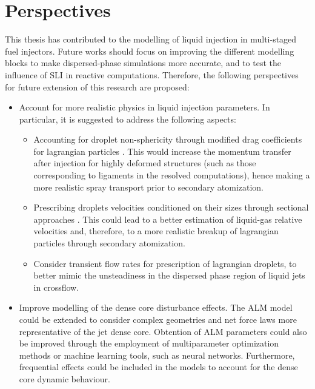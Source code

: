 \clearpage




\section*{Perspectives}

This thesis has contributed to the modelling of liquid injection in multi-staged fuel injectors. Future works should focus on improving the different modelling blocks to make dispersed-phase simulations more accurate, and to test the influence of SLI in reactive computations. Therefore, the following perspectives for future extension of this research are proposed:


\begin{itemize}

	\item Account for more realistic physics in liquid injection parameters.  In particular, it is suggested to address the following aspects:
	
	\begin{itemize}
	
		\item Accounting for droplet non-sphericity through modified drag coefficients for lagrangian particles . This would increase the momentum transfer after injection for highly deformed structures (such as those corresponding to ligaments in the resolved computations), hence making a more realistic spray transport prior to secondary atomization. 
		
		\item Prescribing droplets velocities conditioned on their sizes through sectional approaches . This could lead to a better estimation of liquid-gas relative velocities and, therefore, to a more realistic breakup of lagrangian particles through secondary atomization.
		
		\item Consider transient flow rates for prescription of lagrangian droplets, to better mimic the unsteadiness in the dispersed phase region of liquid jets in crossflow.
	
	\end{itemize}
	
	\item Improve modelling of the dense core disturbance effects. The ALM model could be extended to consider complex geometries and net force laws more representative of the jet dense core. Obtention of ALM parameters could also be improved through the employment of multiparameter optimization methods or machine learning tools, such as neural networks. Furthermore, frequential effects could be included in the models to account for the dense core dynamic behaviour.
	

\end{itemize}

